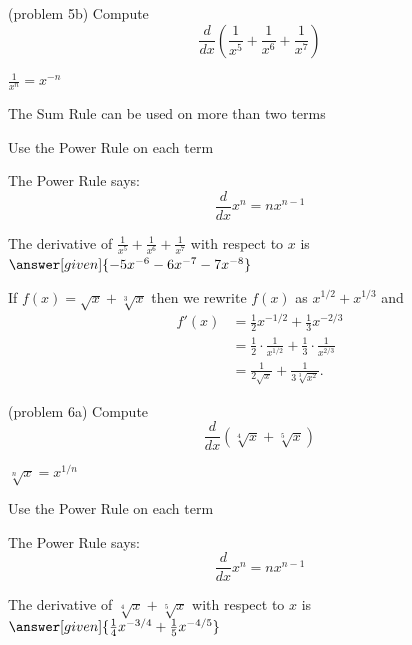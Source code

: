 \documentclass{ximera}
\begin{document}
\begin{problem}(problem 5b)
  Compute 
  \[
  \frac{d}{dx} \left(\frac{1}{x^5} + \frac{1}{x^6} + \frac{1}{x^7}\right)
  \]
  
    \begin{hint}
		 $\frac{1}{x^n} = x^{-n}$
		\end{hint}
		\begin{hint}
		  The Sum Rule can be used on more than two terms
		\end{hint}
		\begin{hint}
      Use the Power Rule on each term
    \end{hint}
    \begin{hint}
      The Power Rule says:
      \[
      \frac{d}{dx} x^n = nx^{n-1}
      \]
    \end{hint}    
		The derivative of $\frac{1}{x^5} + \frac{1}{x^6} + \frac{1}{x^7}$ with respect to $x$ is
		 $\answer[given]{-5x^{-6} -6x^{-7} - 7x^{-8}}$
	\
\end{problem}



\begin{example}[example 6]
 If $f(x) = \sqrt x + \sqrt[3] x$ then we rewrite $f(x)$ as $x^{1/2} + x^{1/3}$ and
\begin{align*}
f'(x) &= \tfrac12 x^{-1/2} + \tfrac13 x^{-2/3} \\
&= \tfrac12 \cdot \frac{1}{x^{1/2}} + \tfrac13 \cdot \frac{1}{x^{2/3}}\\
&= \frac{1}{2\sqrt x} + \frac{1}{3\sqrt[3] {x^2}}.
\end{align*}
\end{example}


\begin{problem}(problem 6a)
  Compute 
  \[
  \frac{d}{dx} \left(\sqrt[4] x + \sqrt[5] x\right)
  \]
  
    \begin{hint}
		 $\sqrt[n] x = x^{1/n}$
		\end{hint}
		\begin{hint}
      Use the Power Rule on each term
    \end{hint}
    \begin{hint}
      The Power Rule says:
      \[
      \frac{d}{dx} x^n = nx^{n-1}
      \]
    \end{hint}    
		The derivative of $\sqrt[4] x + \sqrt[5] x$ with respect to $x$ is
		 $\answer[given]{\frac14 x^{-3/4} + \frac15 x^{-4/5}}$
	
\end{problem}
\end{document}
